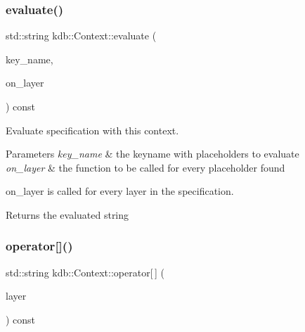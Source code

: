 \subsubsection{\texorpdfstring{evaluate()}{evaluate()}\hspace{0.1cm}{\footnotesize\ttfamily [2/2]}}
{\footnotesize\ttfamily std\+::string kdb\+::\+Context\+::evaluate (\begin{DoxyParamCaption}\item[{std\+::string const \&}]{key\+\_\+name,  }\item[{std\+::function$<$ bool(std\+::string const \&, std\+::string \&, bool in\+\_\+group)$>$ const \&}]{on\+\_\+layer }\end{DoxyParamCaption}) const\hspace{0.3cm}{\ttfamily [inline]}}



Evaluate specification with this context. 


\begin{DoxyParams}{Parameters}
{\em key\+\_\+name} & the keyname with placeholders to evaluate \\
\hline
{\em on\+\_\+layer} & the function to be called for every placeholder found\\
\hline
\end{DoxyParams}
\begin{DoxyParagraph}{on\+\_\+layer is called for every layer in the}
specification. 
\end{DoxyParagraph}
\begin{DoxyReturn}{Returns}
the evaluated string 
\end{DoxyReturn}
\mbox{\label{classkdb_1_1Context_adbd89b28f978fb99bb5315cf7732c40f}} 
\subsubsection{\texorpdfstring{operator[]()}{operator[]()}}
{\footnotesize\ttfamily std\+::string kdb\+::\+Context\+::operator\mbox{[}$\,$\mbox{]} (\begin{DoxyParamCaption}\item[{std\+::string const \&}]{layer }\end{DoxyParamCaption}) const\hspace{0.3cm}{\ttfamily [inline]}}



